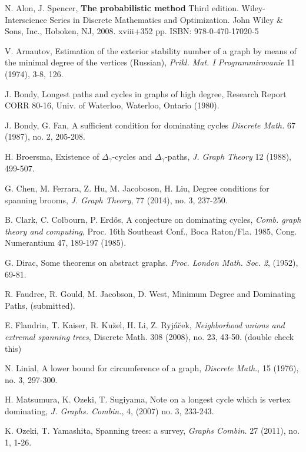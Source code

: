\documentclass[12pt]{amsart}
\begin{document}
\begin{thebibliography}{99}

 N. Alon,  J. Spencer,  {\bf The probabilistic method} Third edition. Wiley-Interscience Series in Discrete Mathematics and Optimization. John Wiley \& Sons, Inc., Hoboken, NJ, 2008. xviii+352 pp. ISBN: 978-0-470-17020-5 

 V. Arnautov, Estimation of the exterior stability number of a graph by means of the minimal degree of the vertices (Russian), {\it{Prikl. Mat. I Programmirovanie}} 11 (1974), 3-8, 126. 

 J. Bondy, Longest paths and cycles in graphs of high degree, Research Report CORR 80-16, Univ. of Waterloo, Waterloo, Ontario (1980).

 J. Bondy, G. Fan,
A sufficient condition for dominating cycles
{\it{Discrete Math.}} 67 (1987), no. 2, 205-208. 

 H. Broersma, Existence of $\Delta_\gamma$-cycles and $\Delta_\gamma$-paths, {\it J. Graph Theory} 12 (1988), 499-507.

 G. Chen, M. Ferrara, Z. Hu, M. Jacoboson, H. Liu, Degree conditions for spanning brooms, {\it{J. Graph Theory}}, 77 (2014), no. 3, 237-250.

 B. Clark, C. Colbourn, P. Erd\H{o}s, A conjecture on dominating cycles, {\it{Comb. graph theory and computing}}, Proc. 16th Southeast Conf., Boca Raton/Fla. 1985, Cong. Numerantium 47, 189-197 (1985).

 G. Dirac, Some theorems on abstract graphs. {\it Proc. London Math. Soc. 2}, (1952), 69-81.

 R. Faudree, R. Gould, M. Jacobson, D. West, Minimum Degree and Dominating Paths, (submitted).

 E. Flandrin, T. Kaiser, R. Ku\u zel, H. Li, Z. Ryj\'a\u cek, {\it Neighborhood unions and extremal spanning trees}, Discrete Math. 308 (2008), no. 23, 43-50. (double check this)

 N. Linial, A lower bound for circumference of a graph, {\it Discrete Math.}, 15 (1976), no. 3, 297-300. 

 H. Matsumura, K. Ozeki, T. Sugiyama, Note on a longest cycle which is vertex dominating, {\it{J. Graphs. Combin.}}, 4, (2007) no. 3, 233-243.

 K. Ozeki, T. Yamashita, Spanning trees: a survey, {\it{Graphs Combin.}} 27 (2011), no. 1, 1-26.


\end{thebibliography}
\end{document}
